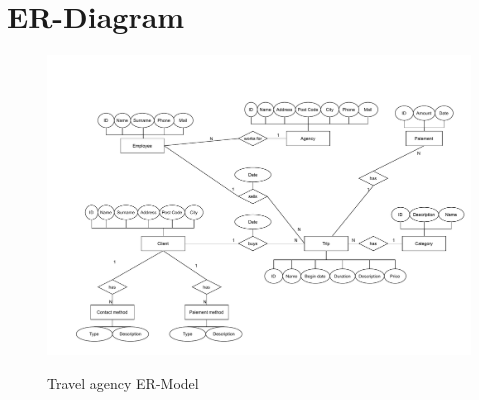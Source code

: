\documentclass{article}
\begin{document}
	\section*{ER-Diagram}
	\begin{figure}[htbp]
		\centering
			\includegraphics[width=1.00\textwidth]{../model.pdf}
		\label{ER-Model}
		\caption{Travel agency ER-Model}
	\end{figure}
	
\end{document}
